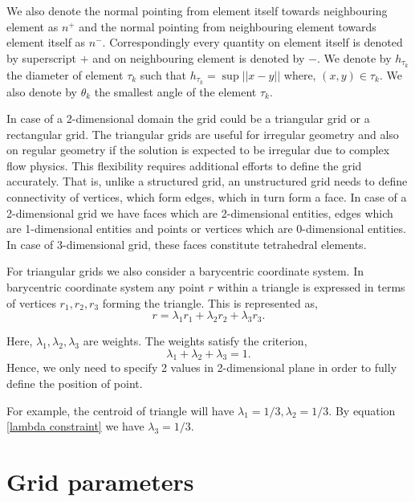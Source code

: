 \documentclass[a4paper,twoside,openright]{book}
\begin{document}
We also denote the normal pointing from element itself towards neighbouring element as $n^+$ and the normal pointing from neighbouring element towards element itself as $n^-$. Correspondingly every quantity on element itself is denoted by superscript $+$ and on neighbouring element is denoted by $-$.  We denote by $h_{\tau_k}$ the diameter of element $\tau_k$ such that $h_{\tau_k} = \sup ||x-y||$ where, $(x,y) \in \tau_k$. We also denote by $\theta_k$ the smallest angle of the element $\tau_k$.

In case of a 2-dimensional domain the grid could be a triangular grid or a rectangular grid. The triangular grids are useful for irregular geometry and also on regular geometry if the solution is expected to be irregular due to complex flow physics. This flexibility requires additional efforts to define the grid accurately. That is, unlike a structured grid, an unstructured grid needs to define connectivity of vertices, which form edges, which in turn form a face. In case of a 2-dimensional grid we have faces which are 2-dimensional entities, edges which are 1-dimensional entities and points or vertices which are 0-dimensional entities. In case of 3-dimensional grid, these faces constitute tetrahedral elements. 

For triangular grids we also consider a barycentric coordinate system. In barycentric coordinate system any point $r$ within a triangle is expressed in terms of vertices $r_1,r_2,r_3$ forming the triangle. This is represented as, \begin{equation}\label{barycentric point}
r = \lambda_1 r_1 + \lambda_2 r_2 + \lambda_3 r_3 \textrm{.}
\end{equation}

Here, $\lambda_1, \lambda_2, \lambda_3$ are weights. The weights satisfy the criterion, 
\begin{equation}\label{lambda constraint} 
\lambda_1 + \lambda_2 + \lambda_3 = 1 \textrm{.}
\end{equation}
Hence, we only need to specify 2 values in 2-dimensional plane in order to fully define the position of point.

For example, the centroid of triangle will have $\lambda_1 = 1/3, \lambda_2 = 1/3$. By equation \eqref{lambda constraint} we have $\lambda_3=1/3$.

\section{Grid parameters}
\end{document}
